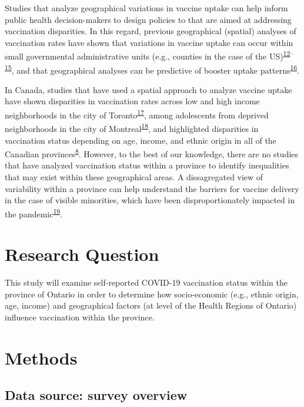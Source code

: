 \documentclass[
  letterpaper,
  DIV=11,
  numbers=noendperiod]{scrartcl}
\begin{document}
Studies that analyze geographical variations in vaccine uptake can help
inform public health decision-makers to design policies to that are
aimed at addressing vaccination disparities. In this regard, previous
geographical (spatial) analyses of vaccination rates have shown that
variations in vaccine uptake can occur within small governmental
administrative units (e.g., counties in the case of the
US)\textsuperscript{\protect\hyperlink{ref-mollalo2021}{12}--\protect\hyperlink{ref-bhuiyan2022}{15}},
and that geographical analyses can be predictive of booster uptake
patterns\textsuperscript{\protect\hyperlink{ref-wood2022}{16}}.

In Canada, studies that have used a spatial approach to analyze vaccine
uptake have shown disparities in vaccination rates across low and high
income neighborhoods in the city of
Toronto\textsuperscript{\protect\hyperlink{ref-choi2021}{17}}, among
adolescents from deprived neighborhoods in the city of
Montreal\textsuperscript{\protect\hyperlink{ref-mckinnon2021}{18}}, and
highlighted disparities in vaccination status depending on age, income,
and ethnic origin in all of the Canadian
provinces\textsuperscript{\protect\hyperlink{ref-guay2022}{8}}. However,
to the best of our knowledge, there are no studies that have analyzed
vaccination status within a province to identify inequalities that may
exist within these geographical areas. A dissagregated view of
variability within a province can help understand the barriers for
vaccine delivery in the case of visible minorities, which have been
disproportionately impacted in the
pandemic\textsuperscript{\protect\hyperlink{ref-hussain2022}{19}}.

\hypertarget{research-question}{%
\section{Research Question}\label{research-question}}

This study will examine self-reported COVID-19 vaccination status within
the province of Ontario in order to determine how socio-economic (e.g.,
ethnic origin, age, income) and geographical factors (at level of the
Health Regions of Ontario) influence vaccination within the province.

\hypertarget{methods}{%
\section{Methods}\label{methods}}

\hypertarget{data-source-survey-overview}{%
\subsection{Data source: survey
overview}\label{data-source-survey-overview}}
\end{document}
